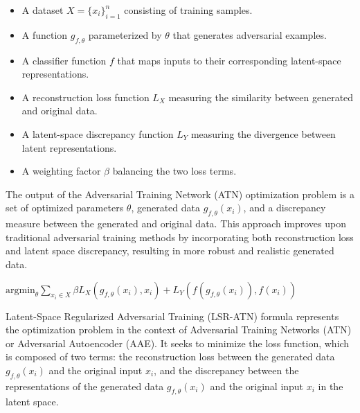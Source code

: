 \begin{itemize}
    \item A dataset $X = \{x_i\}_{i=1}^{n}$ consisting of training samples.
    \item A function $g_{f,\theta}$ parameterized by $\theta$ that generates adversarial examples.
    \item A classifier function $f$ that maps inputs to their corresponding latent-space representations.
    \item A reconstruction loss function $L_X$ measuring the similarity between generated and original data.
    \item A latent-space discrepancy function $L_Y$ measuring the divergence between latent representations.
    \item A weighting factor $\beta$ balancing the two loss terms.
\end{itemize}

The output of the Adversarial Training Network (ATN) optimization problem is a set of optimized parameters $\theta$, generated data $g_{f,\theta}(x_i)$, and a discrepancy measure between the generated and original data. This approach improves upon traditional adversarial training methods by incorporating both reconstruction loss and latent space discrepancy, resulting in more robust and realistic generated data.

$\text{argmin}_{\theta} \sum_{x_i \in X} \beta L_X(g_{f,\theta}(x_i), x_i) + L_Y(f(g_{f,\theta}(x_i)), f(x_i))$

Latent-Space Regularized Adversarial Training (LSR-ATN) formula represents the optimization problem in the context of Adversarial Training Networks (ATN) or Adversarial Autoencoder (AAE). It seeks to minimize the loss function, which is composed of two terms: the reconstruction loss between the generated data $g_{f,\theta}(x_i)$ and the original input $x_i$, and the discrepancy between the representations of the generated data $g_{f,\theta}(x_i)$ and the original input $x_i$ in the latent space.